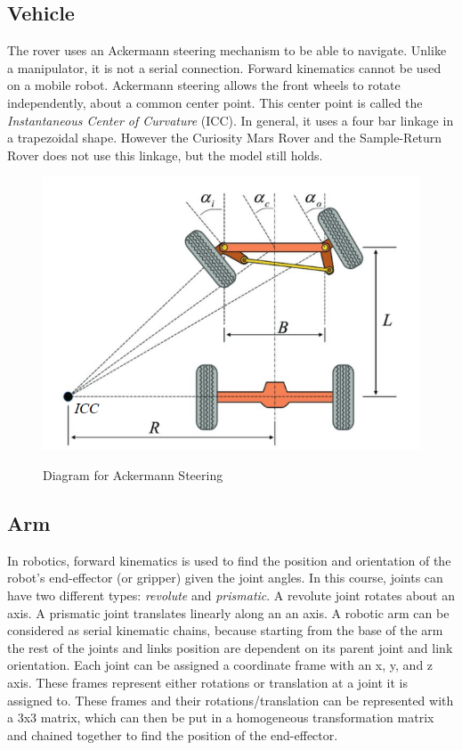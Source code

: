 \subsection{Vehicle}
The rover uses an Ackermann steering mechanism to be able to navigate. Unlike a manipulator, it is not a serial connection. Forward kinematics cannot be used on a mobile robot. Ackermann steering allows the front wheels to rotate independently, about a common center point. This center point is called the \textit{Instantaneous Center of Curvature} (ICC). In general, it uses a four bar linkage in a trapezoidal shape. However the Curiosity Mars Rover and the Sample-Return Rover does not use this linkage, but the model still holds. 

\begin{figure}[h!]
	\centering
	\includegraphics[scale=0.65]{sections/robot-design/images/ackermann_steering.png}
	\label{sample_return_rover:robot_design:ackermann}
	\caption{Diagram for Ackermann Steering}
\end{figure}

\subsection{Arm}
In robotics, forward kinematics is used to find the position and orientation of the robot's end-effector (or gripper) given the joint angles. In this course, joints can have two different types: \textit{revolute} and \textit{prismatic}. A revolute joint rotates about an axis. A prismatic joint translates linearly along an an axis. A robotic arm can be considered as serial kinematic chains, because starting from the base of the arm the rest of the joints and links position are dependent on its parent joint and link orientation. Each joint can be assigned a coordinate frame with an x, y, and z axis. These frames represent either rotations or translation at a joint it is assigned to. These frames and their rotations/translation can be represented with a 3x3 matrix, which can then be put in a homogeneous transformation matrix and chained together to find the position of the end-effector. \\

